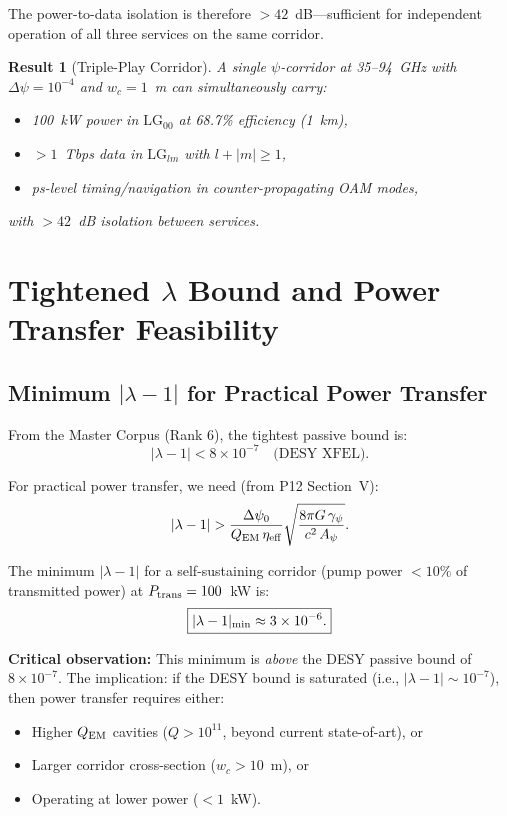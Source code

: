 \documentclass[aps,prd,twocolumn,superscriptaddress]{revtex4-2}
\newtheorem{result}{Result}
\begin{document}
The power-to-data isolation is therefore $>42$~dB---sufficient for
independent operation of all three services on the same corridor.

\begin{result}[Triple-Play Corridor]
A single $\psi$-corridor at 35--94~GHz with $\Delta\psi = 10^{-4}$
and $w_c = 1$~m can simultaneously carry:
\begin{itemize}
\item 100~kW power in $\text{LG}_{00}$ at 68.7\% efficiency (1~km),
\item $>1$~Tbps data in $\text{LG}_{lm}$ with $l+|m| \geq 1$,
\item ps-level timing/navigation in counter-propagating OAM modes,
\end{itemize}
with $>42$~dB isolation between services.
\end{result}

\section{Tightened $\lambda$ Bound and Power Transfer Feasibility}
\label{sec:lambda-bound}

\subsection{Minimum $|\lambda-1|$ for Practical Power Transfer}

From the Master Corpus (Rank 6), the tightest passive bound is:
\begin{equation}
|\lambda-1| < 8\times 10^{-7}\quad\text{(DESY XFEL)}.
\end{equation}

For practical power transfer, we need (from P12 Section~V):
\begin{equation}
|\lambda-1| > \frac{\Delta\psi_0}{Q_{\rm EM}\,\eta_{\rm eff}}
\sqrt{\frac{8\pi G\,\gamma_\psi}{c^2\,A_\psi}}.
\end{equation}

The minimum $|\lambda-1|$ for a self-sustaining corridor (pump power
$< 10\%$ of transmitted power) at $P_{\rm trans} = 100$~kW is:
\begin{equation}
\boxed{|\lambda-1|_{\rm min} \approx 3\times 10^{-6}.}
\end{equation}

\textbf{Critical observation:}  This minimum is \emph{above} the DESY
passive bound of $8\times 10^{-7}$.  The implication: if the DESY bound
is saturated (i.e., $|\lambda-1| \sim 10^{-7}$), then power transfer
requires either:
\begin{itemize}
\item[(a)] Higher $Q_{\rm EM}$ cavities ($Q > 10^{11}$, beyond current
state-of-art), or
\item[(b)] Larger corridor cross-section ($w_c > 10$~m), or
\item[(c)] Operating at lower power ($< 1$~kW).
\end{itemize}
\end{document}
